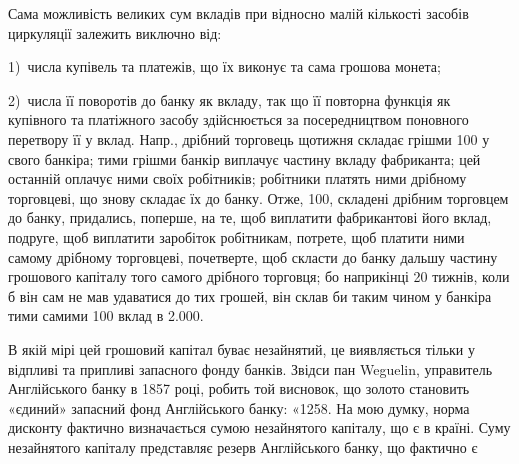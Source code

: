 Сама можливість великих сум вкладів при відносно малій кількості засобів
циркуляції залежить виключно від:

1)~числа купівель та платежів, що їх виконує та сама грошова монета;

2)~числа її поворотів до банку як вкладу, так що її повторна функція як
купівного та платіжного засобу здійснюється за посередництвом поновного перетвору
її у вклад. Напр., дрібний торговець щотижня складає грішми 100
у свого банкіра; тими грішми банкір виплачує частину вкладу фабриканта;
цей останній оплачує ними своїх робітників; робітники платять ними дрібному
торговцеві, що знову складає їх до банку. Отже, 100, складені дрібним
торговцем до банку, придались, поперше, на те, щоб виплатити фабрикантові
його вклад, подруге, щоб виплатити заробіток робітникам, потрете, щоб платити
ними самому дрібному торговцеві, почетверте, щоб скласти до банку дальшу
частину грошового капіталу того самого дрібного торговця; бо наприкінці
20 тижнів, коли б він сам не мав удаватися до тих грошей, він склав би таким
чином у банкіра тими самими 100 вклад в \num{2.000}.

В якій мірі цей грошовий капітал буває незайнятий, це виявляється тільки
у відпливі та припливі запасного фонду банків. Звідси пан Weguelin, управитель
Англійського банку в 1857 році, робить той висновок, що золото становить
«єдиний» запасний фонд Англійського банку: «1258. На мою думку, норма
дисконту фактично визначається сумою незайнятого капіталу, що є в країні. Суму
незайнятого капіталу представляє резерв Англійського банку, що фактично є
\parbreak{}  %
